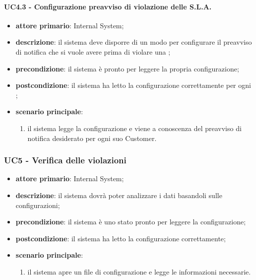 \paragraph{UC4.3 - Configurazione preavviso di violazione delle S.L.A.}
\begin{itemize}
	\item \textbf{attore primario}: Internal System;
	\item \textbf{descrizione}: il sistema deve disporre di un modo per configurare il preavviso di notifica che si vuole avere prima di violare una ;
	\item \textbf{precondizione}: il sistema è pronto per leggere la propria configurazione;
	\item \textbf{postcondizione}: il sistema ha letto la configurazione correttamente per ogni ; 
	\item \textbf{scenario principale}: 
	\begin{enumerate}
		\item il sistema legge la configurazione e viene a conoscenza del preavviso di notifica desiderato per ogni suo Customer.
	\end{enumerate}
\end{itemize}

\subsubsection{UC5 - Verifica delle violazioni}
\begin{itemize}
	\item \textbf{attore primario}: Internal System;
	\item \textbf{descrizione}: il sistema dovrà poter analizzare i dati basandoli sulle configurazioni;
	\item \textbf{precondizione}: il sistema è uno stato pronto per leggere la configurazione;
	\item \textbf{postcondizione}: il sistema ha letto la configurazione correttamente;
	\item \textbf{scenario principale}: 
	\begin{enumerate}
		\item il sistema apre un file di configurazione e legge le informazioni necessarie.
	\end{enumerate}
\end{itemize}
